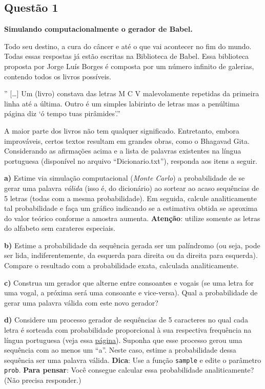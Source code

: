 \documentclass[
  a4paper]{article}
\begin{document}
\newpage

\hypertarget{questuxe3o-1}{%
\subsection{\texorpdfstring{\textbf{Questão
1}}{Questão 1}}\label{questuxe3o-1}}

\textbf{Simulando computacionalmente o gerador de Babel.}

Todo seu destino, a cura do câncer e até o que vai acontecer no fim do
mundo. Todas essas respostas já estão escritas na Biblioteca de Babel.
Essa biblioteca proposta por Jorge Luís Borges é composta por um número
infinito de galerias, contendo todos os livros possíveis.

'' {[}\ldots{]} Um (livro) constava das letras M C V malevolamente
repetidas da primeira linha até a última. Outro é um simples labirinto
de letras mas a penúltima página diz `ó tempo tuas pirâmides'.''

A maior parte dos livros não tem qualquer significado. Entretanto,
embora improváveis, certos textos resultam em grandes obras, como o
Bhagavad Gita. Considerando as afirmações acima e a lista de palavras
existentes na língua portuguesa (disponível no arquivo
``Dicionario.txt''), responda aos itens a seguir.

\textbf{a)} Estime via simulação computacional (\emph{Monte Carlo}) a
probabilidade de se gerar uma palavra \emph{válida} (isso é, do
dicionário) ao sortear ao acaso sequências de 5 letras (todas com a
mesma probabilidade). Em seguida, calcule analiticamente tal
probabilidade e faça um gráfico indicando se a estimativa obtida se
aproxima do valor teórico conforme a amostra aumenta. \textbf{Atenção}:
utilize somente as letras do alfabeto sem carateres especiais.

\textbf{b)} Estime a probabilidade da sequência gerada ser um palíndromo
(ou seja, pode ser lida, indiferentemente, da esquerda para direita ou
da direita para esquerda). Compare o resultado com a probabilidade
exata, calculada analiticamente.

\textbf{c)} Construa um gerador que alterne entre consoantes e vogais
(se uma letra for uma vogal, a próxima será uma consoante e vice-versa).
Qual a probabilidade de gerar uma palavra válida com este novo gerador?

\textbf{d)} Considere um processo gerador de sequências de 5 caracteres
no qual cada letra é sorteada com probabilidade proporcional à sua
respectiva frequência na língua portuguesa (veja essa
\href{https://pt.wikipedia.org/wiki/Frequ\%C3\%AAncia_de_letras?wprov=sfla1}{página}).
Suponha que esse processo gerou uma sequência com ao menos um ``a''.
Neste caso, estime a probabilidade dessa sequência ser uma palavra
válida. \textbf{Dica}: Use a função \texttt{sample} e edite o parâmetro
\texttt{prob}. \textbf{Para pensar}: Você consegue calcular essa
probabilidade analiticamente? (Não precisa responder.)
\end{document}
